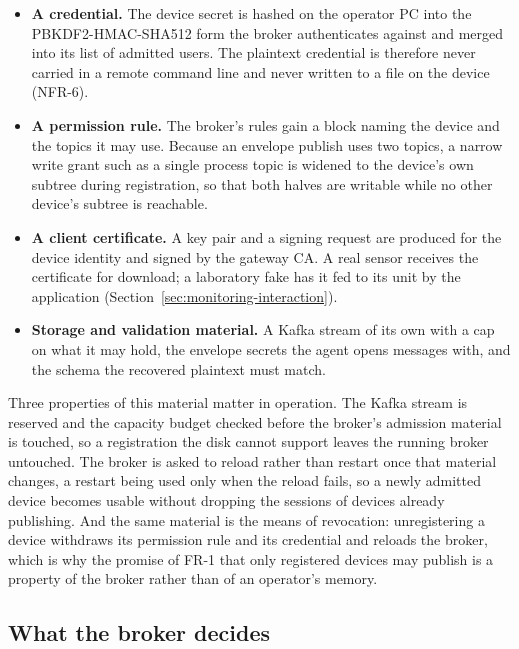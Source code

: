 \documentclass[12pt,a4paper]{report}
\begin{document}
\begin{itemize}
    \item \textbf{A credential.}
    The device secret is hashed on the operator PC into the
    PBKDF2-HMAC-SHA512 form the broker authenticates against and
    merged into its list of admitted users. The plaintext credential
    is therefore never carried in a remote command line and never
    written to a file on the device (NFR-6).
    \item \textbf{A permission rule.}
    The broker's rules gain a block naming the device and the topics
    it may use. Because an envelope publish uses two topics, a narrow
    write grant such as a single process topic is widened to the
    device's own subtree during registration, so that both halves
    are writable while no other device's subtree is reachable.
    \item \textbf{A client certificate.}
    A key pair and a signing request are produced for the device
    identity and signed by the gateway CA. A real sensor receives
    the certificate for download; a laboratory fake has it fed to
    its unit by the application
    (Section~\ref{sec:monitoring-interaction}).
    \item \textbf{Storage and validation material.}
    A Kafka stream of its own with a cap on what it may hold, the
    envelope secrets the agent opens messages with, and the schema
    the recovered plaintext must match.
\end{itemize}

Three properties of this material matter in operation. The Kafka
stream is reserved and the capacity budget checked before the
broker's admission material is touched, so a registration the disk
cannot support leaves the running broker untouched. The broker is
asked to reload rather than restart once that material changes, a
restart being used only when the reload fails, so a newly admitted
device becomes usable without dropping the sessions of devices
already publishing. And the same material is the means of
revocation: unregistering a device withdraws its permission rule and
its credential and reloads the broker, which is why the promise of
FR-1 that only registered devices may publish is a property of the
broker rather than of an operator's memory.

\subsection{What the broker decides}
\label{sec:gw-broker-decisions}
\end{document}
